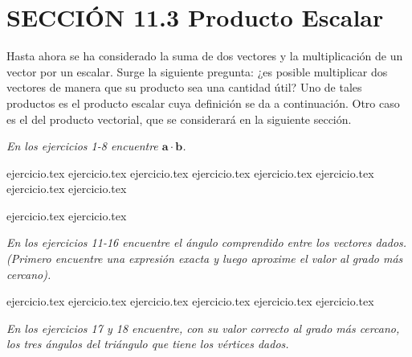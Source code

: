 
\section*{SECCIÓN 11.3 \quad Producto Escalar}

Hasta ahora se ha considerado la suma de dos vectores y la multiplicación de un vector por un escalar. Surge la siguiente pregunta: ¿es posible multiplicar dos vectores de manera que su producto sea una cantidad útil? Uno de tales productos es el producto escalar cuya definición se da a continuación. Otro caso es el del producto vectorial, que se considerará en la siguiente sección.

\vspace{0.5cm}
\noindent\textit{En los ejercicios 1-8 encuentre $\mathbf{a} \cdot \mathbf{b}$.}

\begin{enumerate}
    {ejercicio.tex}
{ejercicio.tex}
{ejercicio.tex}
{ejercicio.tex}
{ejercicio.tex}
{ejercicio.tex}
{ejercicio.tex}
{ejercicio.tex}
\end{enumerate}

\vspace{0.3cm}
\begin{enumerate}
    \setcounter{enumi}{8}
    {ejercicio.tex}
{ejercicio.tex}
\end{enumerate}

\vspace{0.3cm}
\noindent\textit{En los ejercicios 11-16 encuentre el ángulo comprendido entre los vectores dados. (Primero encuentre una expresión exacta y luego aproxime el valor al grado más cercano).}

\begin{enumerate}
    \setcounter{enumi}{10}
    {ejercicio.tex}
{ejercicio.tex}
{ejercicio.tex}
{ejercicio.tex}
{ejercicio.tex}
{ejercicio.tex}
\end{enumerate}

\vspace{0.3cm}
\noindent\textit{En los ejercicios 17 y 18 encuentre, con su valor correcto al grado más cercano, los tres ángulos del triángulo que tiene los vértices dados.}

